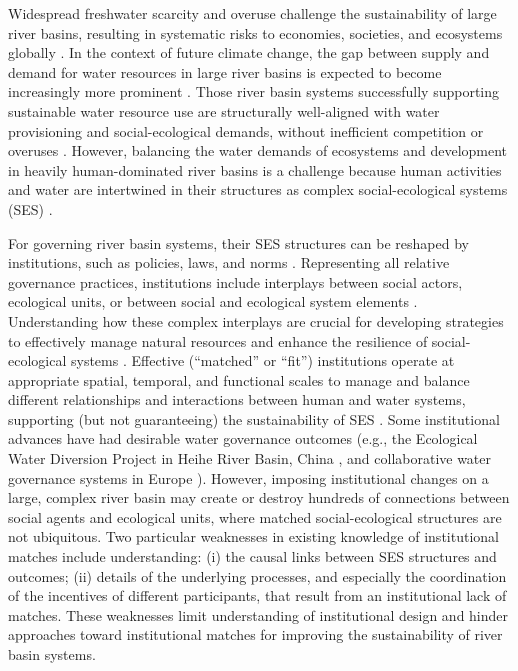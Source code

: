Widespread freshwater scarcity and overuse challenge the sustainability of large river basins, resulting in systematic risks to economies, societies, and ecosystems globally \cite{distefano2017, dolan2021, xu2020b, mekonnen2016}.
In the context of future climate change, the gap between supply and demand for water resources in large river basins is expected to become increasingly more prominent \cite{florke2018, yoon2021}.
Those river basin systems successfully supporting sustainable water resource use are structurally well-aligned with water provisioning and social-ecological demands, without inefficient competition or overuses \cite{wang2019d}.
However, balancing the water demands of ecosystems and development in heavily human-dominated river basins is a challenge because human activities and water are intertwined in their structures as complex social-ecological systems (SES) \cite{huggins2022,konar2019}.

For governing river basin systems, their SES structures can be reshaped by institutions, such as policies, laws, and norms \cite{young2008,cumming2020b}.
Representing all relative governance practices, institutions include interplays between social actors, ecological units, or between social and ecological system elements
\cite{lien2020, bodin2017b}.
Understanding how these complex interplays are crucial for developing strategies to effectively manage natural resources and enhance the resilience of social-ecological systems \cite{kluger2020}.
Effective (``matched'' or ``fit'') institutions operate at appropriate spatial, temporal, and functional scales to manage and balance different relationships and interactions between human and water systems, supporting (but not guaranteeing) the sustainability of SES \cite{epstein2015, wang2019d}.
Some institutional advances have had desirable water governance outcomes (e.g., the Ecological Water Diversion Project in Heihe River Basin, China \cite{wang2019d}, and collaborative water governance systems in Europe \cite{green2013}).
However, imposing institutional changes on a large, complex river basin may create or destroy hundreds of connections between social agents and ecological units, where matched social-ecological structures are not ubiquitous.
Two particular weaknesses in existing knowledge of institutional matches include understanding: (i) the causal links between SES structures and outcomes; (ii) details of the underlying processes, and especially the coordination of the incentives of different participants, that result from an institutional lack of matches.
These weaknesses limit understanding of institutional design and hinder approaches toward institutional matches for improving the sustainability of river basin systems.

